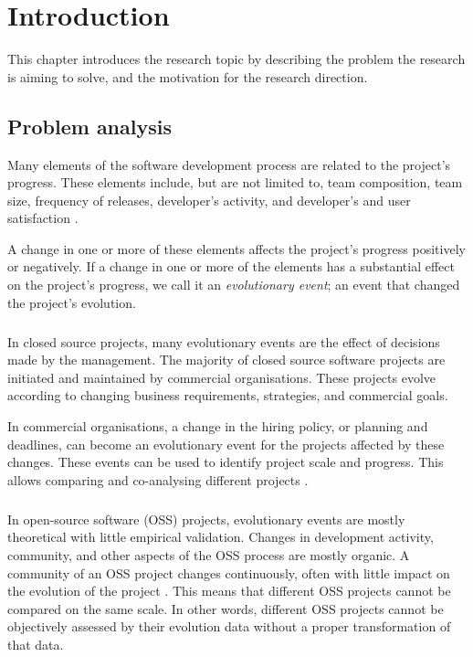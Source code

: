\chapter{Introduction}
\label{introduction}

This chapter introduces the research topic by describing the problem the
research is aiming to solve, and the motivation for the research direction.

\section{Problem analysis}
Many elements of the software development process are related to the project's
progress. These elements include, but are not limited to, team composition,
team size, frequency of releases, developer's activity, and developer's and
user satisfaction \cite{crowston2006, delone1992, samoladas2010}.

A change in one or more of these elements affects the project's progress
positively or negatively. If a change in one or more of the elements has a
substantial effect on the project's progress, we call it an \emph{evolutionary
event}\rm; an event that changed the project's evolution.

\paragraph{}
In closed source projects, many evolutionary events are the effect of decisions
made by the management. The majority of closed source software projects are
initiated and maintained by commercial organisations. These projects evolve
according to changing business requirements, strategies, and commercial goals.

In commercial organisations, a change in the hiring policy, or planning and
deadlines, can become an evolutionary event for the projects affected by these
changes. These events can be used to identify project scale and progress. This
allows comparing and co-analysing different projects \cite{karus2013}.

\paragraph{}
In open-source software (OSS) projects, evolutionary events are mostly
theoretical with little empirical validation. Changes in development activity,
community, and other aspects of the OSS process are mostly organic. A community
of an OSS project changes continuously, often with little impact on the
evolution of the project \cite{androutsellis}. This means that different OSS
projects cannot be compared on the same scale. In other words, different OSS
projects cannot be objectively assessed by their evolution data without a
proper transformation of that data.

